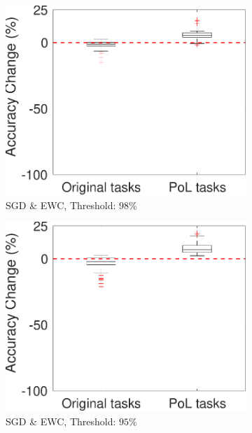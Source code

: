 \begin{figure}[!t]
    \centering
    \begin{subfigure}{.3\textwidth}
        \includegraphics[width=1\textwidth]{../other/figures/98-115-4_v5.pdf}
        \caption{SGD \& EWC, Threshold: $98\%$}
        \label{98_box}
    \end{subfigure}
    \begin{subfigure}{.3\textwidth}
        \includegraphics[width=1\textwidth]{../other/figures/95-116-4_v3.pdf}
        \caption{SGD \& EWC, Threshold: $95\%$}
        \label{95_box}
    \end{subfigure}
    \begin{subfigure}{.3\textwidth}

\end{subfigure}
\end{figure}
